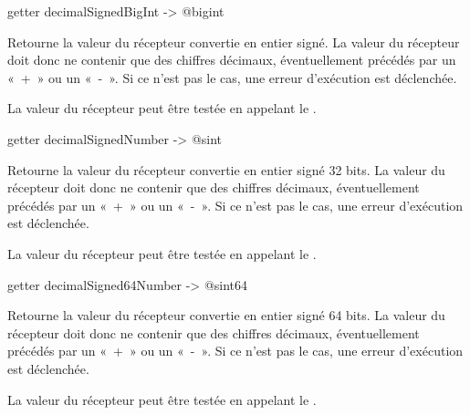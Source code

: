 
\begin{galgasbox}
getter decimalSignedBigInt -> @bigint
\end{galgasbox}

Retourne la valeur du récepteur convertie en entier signé. La valeur du récepteur doit donc ne contenir que des chiffres décimaux, éventuellement précédés par un «~+~» ou un «~-~». Si ce n'est pas le cas, une erreur d'exécution est déclenchée.

La valeur du récepteur peut être testée en appelant le .








\begin{galgasbox}
getter decimalSignedNumber -> @sint
\end{galgasbox}

Retourne la valeur du récepteur convertie en entier signé 32 bits. La valeur du récepteur doit donc ne contenir que des chiffres décimaux, éventuellement précédés par un «~+~» ou un «~-~». Si ce n'est pas le cas, une erreur d'exécution est déclenchée.

La valeur du récepteur peut être testée en appelant le .








\begin{galgasbox}
getter decimalSigned64Number -> @sint64
\end{galgasbox}

Retourne la valeur du récepteur convertie en entier signé 64 bits. La valeur du récepteur doit donc ne contenir que des chiffres décimaux, éventuellement précédés par un «~+~» ou un «~-~». Si ce n'est pas le cas, une erreur d'exécution est déclenchée.

La valeur du récepteur peut être testée en appelant le .








